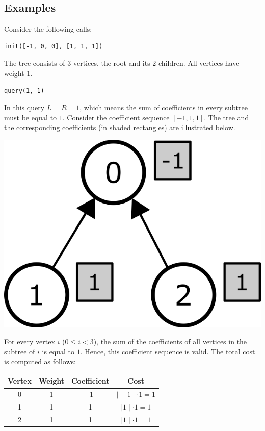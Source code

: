 \hypertarget{examples}{%
\subsection{Examples}\label{examples}}

Consider the following calls:

\begin{verbatim}
init([-1, 0, 0], [1, 1, 1])
\end{verbatim}

The tree consists of \(3\) vertices, the root and its \(2\) children.
All vertices have weight \(1\).

\begin{verbatim}
query(1, 1)
\end{verbatim}

In this query \(L = R = 1\), which means the sum of coefficients in
every subtree must be equal to \(1\). Consider the coefficient sequence
\([-1, 1, 1]\). The tree and the corresponding coefficients (in shaded
rectangles) are illustrated below.

\includegraphics{ex1.png}

For every vertex \(i\) (\(0 \leq i < 3\)), the sum of the coefficients
of all vertices in the subtree of \(i\) is equal to \(1\). Hence, this
coefficient sequence is valid. The total cost is computed as follows:

\begin{longtable}[]{@{}cccc@{}}
\toprule
Vertex & Weight & Coefficient & Cost\tabularnewline
\midrule
\endhead
0 & 1 & -1 & \(\mid -1 \mid \cdot 1 = 1\)\tabularnewline
1 & 1 & 1 & \(\mid 1 \mid \cdot 1 = 1\)\tabularnewline
2 & 1 & 1 & \(\mid 1 \mid \cdot 1 = 1\)\tabularnewline
\bottomrule
\end{longtable}

